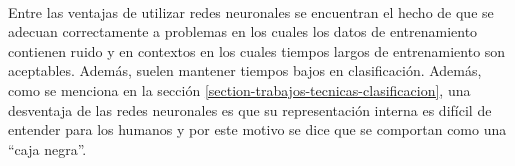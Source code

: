 \paragraph{}Entre las ventajas de utilizar redes neuronales se encuentran el hecho de que se adecuan correctamente a problemas en los cuales los datos de entrenamiento contienen ruido y en contextos en los cuales tiempos largos de entrenamiento son aceptables. Además, suelen mantener tiempos bajos en clasificación.
Además, como se menciona en la sección \ref{section-trabajos-tecnicas-clasificacion}, una desventaja de las redes neuronales es que su representación interna es difícil de entender para los humanos y por este motivo se dice que se comportan como una “caja negra”.